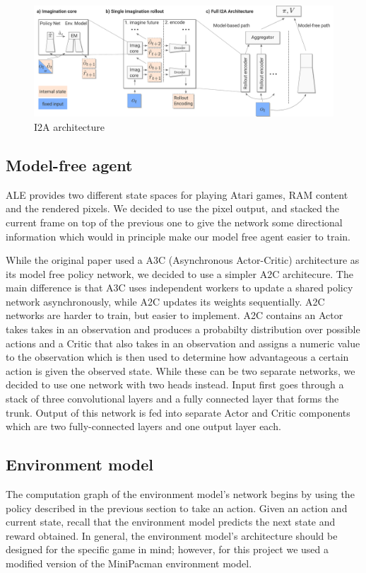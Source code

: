 \documentclass[10pt, twocolumn]{article}
\begin{document}
\begin{figure}
\centering
\includegraphics[scale=0.3]{i2a}
\caption{I2A architecture}
\end{figure}

\subsection{Model-free agent}
ALE provides two different state spaces for playing Atari games, RAM content and the rendered pixels. We decided to use the pixel output, and stacked the current frame on top of the previous one to give the network some directional information which would in principle make our model free agent easier to train.

While the original paper used a A3C (Asynchronous Actor-Critic) architecture as its model free policy network, we decided to use a simpler A2C architecure.
The main difference is that A3C uses independent workers to update a shared policy network asynchronously, while A2C updates its weights sequentially.
A2C networks are harder to train, but easier to implement.
A2C contains an Actor takes takes in an observation and produces a probabilty distribution over possible actions and a Critic that also takes in an observation and assigns a numeric value to the observation which is then used to determine how advantageous a certain action is given the observed state.
While these can be two separate networks, we decided to use one network with two heads instead.
Input first goes through a stack of three convolutional layers and a fully connected layer that forms the trunk.
Output of this network is fed into separate Actor and Critic components which are two fully-connected layers and one output layer each.

\subsection{Environment model}

The computation graph of the environment model's network begins by using the policy described in the
previous section to take an action. Given an action and current state, recall that the environment model
predicts the next state and reward obtained. In general, the environment model's architecture should be
designed for the specific game in mind; however, for this project we used a modified version of the
MiniPacman environment model.
\end{document}
